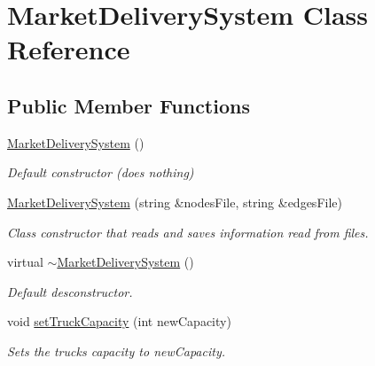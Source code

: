 \hypertarget{class_market_delivery_system}{}\section{Market\+Delivery\+System Class Reference}
\label{class_market_delivery_system}
\subsection*{Public Member Functions}
\begin{DoxyCompactItemize}
\item 
\hypertarget{class_market_delivery_system_ad45ca965ed9050bce22d1c6b39ed37f1}{}\label{class_market_delivery_system_ad45ca965ed9050bce22d1c6b39ed37f1} 
\hyperlink{class_market_delivery_system_ad45ca965ed9050bce22d1c6b39ed37f1}{Market\+Delivery\+System} ()
\begin{DoxyCompactList}\small\item\em Default constructor (does nothing) \end{DoxyCompactList}\item 
\hyperlink{class_market_delivery_system_ad30257b3af92467a6fa6f4fea7ad4801}{Market\+Delivery\+System} (string \&nodes\+File, string \&edges\+File)
\begin{DoxyCompactList}\small\item\em Class constructor that reads and saves information read from files. \end{DoxyCompactList}\item 
\hypertarget{class_market_delivery_system_ae7d6e1bc2fc203a1310efa88d61bcb91}{}\label{class_market_delivery_system_ae7d6e1bc2fc203a1310efa88d61bcb91} 
virtual \hyperlink{class_market_delivery_system_ae7d6e1bc2fc203a1310efa88d61bcb91}{$\sim$\+Market\+Delivery\+System} ()
\begin{DoxyCompactList}\small\item\em Default desconstructor. \end{DoxyCompactList}\item 
void \hyperlink{class_market_delivery_system_a2f7b0dea30ea078b085dc04ac7086059}{set\+Truck\+Capacity} (int new\+Capacity)
\begin{DoxyCompactList}\small\item\em Sets the trucks\textquotesingle{} capacity to new\+Capacity. \end{DoxyCompactList}\item 
\hypertarget{class_market_delivery_system_a0378fc4bd1be5df58c5d668bcb287b88}{}\label{class_market_delivery_system_a0378fc4bd1be5df58c5d668bcb287b88} 

\end{DoxyCompactItemize}
